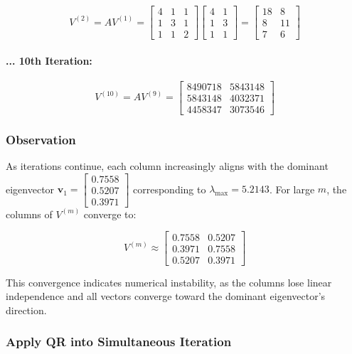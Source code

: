 $$
V^{(2)} = A V^{(1)} = \begin{bmatrix} 4 & 1 & 1 \\ 1 & 3 & 1 \\ 1 & 1 & 2 \end{bmatrix} \begin{bmatrix} 4 & 1 \\ 1 & 3 \\ 1 & 1 \end{bmatrix} = \begin{bmatrix} 18 & 8 \\ 8 & 11 \\ 7 & 6 \end{bmatrix}
$$

\paragraph{... 10th Iteration:}

$$
V^{(10)} = A V^{(9)} = \begin{bmatrix} 8490718 & 5843148 \\ 5843148 & 4032371 \\ 4458347 & 3073546 \end{bmatrix}
$$

\subsubsection*{Observation}

As iterations continue, each column increasingly aligns with the dominant eigenvector $\mathbf{v}_1 = \begin{bmatrix} 0.7558 \\ 0.5207 \\ 0.3971 \end{bmatrix}$ corresponding to $\lambda_{\max} = 5.2143$. For large $ m $, the columns of $ V^{(m)} $ converge to:

$$
V^{(m)} \approx \begin{bmatrix} 0.7558 & 0.5207 \\ 0.3971 & 0.7558 \\ 0.5207 & 0.3971 \end{bmatrix}
$$

This convergence indicates numerical instability, as the columns lose linear independence and all vectors converge toward the dominant eigenvector's direction.

\subsubsection*{Apply QR into Simultaneous Iteration}

